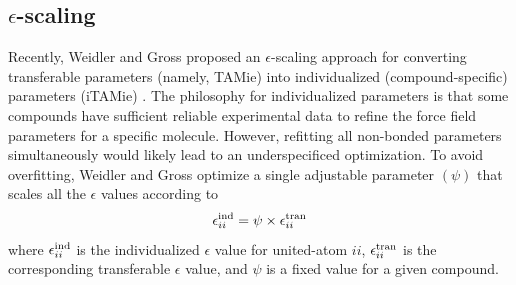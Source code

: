 \documentclass[journal=jced,manuscript=article]{achemso}
\begin{document}


\subsection{$\epsilon$-scaling}

Recently, Weidler and Gross proposed an $\epsilon$-scaling approach for converting transferable parameters (namely, TAMie) into individualized (compound-specific) parameters (iTAMie) \cite{Weidler2018}. The philosophy for individualized parameters is that some compounds have sufficient reliable experimental data to refine the force field parameters for a specific molecule. However, refitting all non-bonded parameters simultaneously would likely lead to an underspecificed optimization. To avoid overfitting, Weidler and Gross optimize a single adjustable parameter $(\psi)$ that scales all the $\epsilon$ values according to
\begin{equation}
\epsilon_{ii}^{\rm ind} = \psi \times \epsilon_{ii}^{\rm tran}
\end{equation}
where $\epsilon_{ii}^{\rm ind}$ is the individualized $\epsilon$ value for united-atom $ii$, $\epsilon_{ii}^{\rm tran}$ is the corresponding transferable $\epsilon$ value, and $\psi$ is a fixed value for a given compound.



\end{document}
